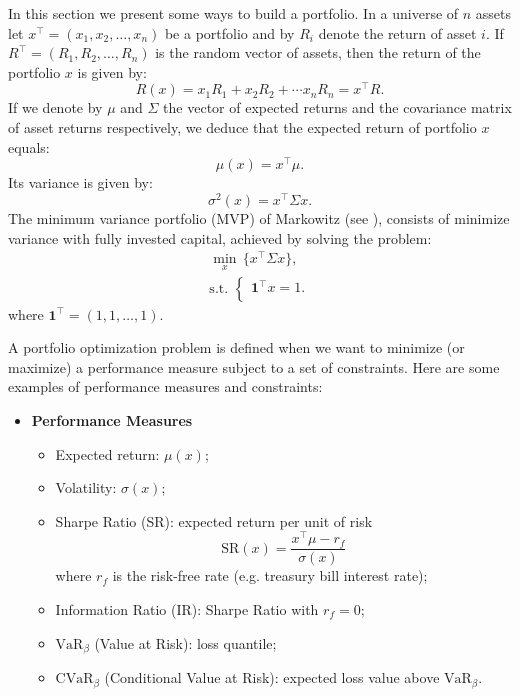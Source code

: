 In this section we present some ways to build a portfolio. In a universe of $n$ assets let $x^\top = (x_1, x_2, \dots, x_n)$ be a portfolio and by $R_i$ denote the return of asset $i$. If $R^\top=(R_1, R_2, \dots, R_n)$  is the random vector of assets, then the return of the portfolio $x$ is given by:
\[
	R(x) = x_1R_1+x_2R_2+\cdots x_nR_n = x^\top R.
\]
If we denote by $\mu$ and $\Sigma$ the vector of expected returns and the covariance matrix of asset returns respectively, we deduce that the expected return of portfolio $x$ equals:
\[
	\mu(x) = x^\top \mu.
\]
Its variance is given by:
\[
	\sigma^2(x) = x^\top \Sigma x.
\]
The minimum variance portfolio (MVP) of Markowitz (see \cite{Markowitz1952}), consists of minimize variance with fully invested capital, achieved by solving the problem:
\begin{eqnarray}\label{eq:MVP}
	\min_{x} \,\big\{x^\top \Sigma x\big\}, \\
	\mbox{s.t. }\left\{
	\begin{aligned}
		\mathbf{1}^\top x=1. \\
	\end{aligned}
	\right.\nonumber
\end{eqnarray}
where $\textbf{1}^\top =(1,1,\dots,1)$.

A portfolio optimization  problem is defined when we want to minimize (or maximize) a performance measure subject to a set of constraints. Here are some examples of performance measures and constraints:

\begin{itemize}
	\item \textbf{Performance Measures}
	      \begin{itemize}
		      \item Expected return: $\mu(x)$;
		      \item Volatility: $\sigma(x)$;
		      \item Sharpe Ratio (SR): expected return per unit of risk
		            \[
			            \mbox{SR}(x) = \frac{x^\top \mu - r_f}{\sigma(x)}
		            \]
		            where $r_f$ is the risk-free rate (e.g. treasury bill interest rate);
		      \item Information Ratio (IR): Sharpe Ratio with $r_f=0$;
		      \item $\mbox{VaR}_\beta$ (Value at Risk): loss quantile;
		      \item $\mbox{CVaR}_\beta$ (Conditional Value at Risk): expected loss value above $\mbox{VaR}_\beta$.
	      \end{itemize}
\end{itemize}

